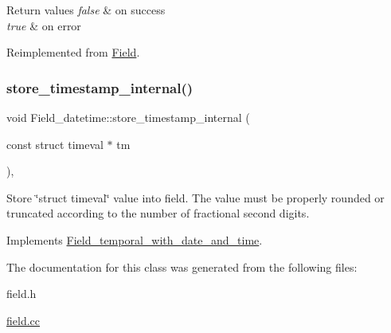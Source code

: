 \begin{DoxyRetVals}{Return values}
{\em false} & on success \\
\hline
{\em true} & on error \\
\hline
\end{DoxyRetVals}


Reimplemented from \mbox{\hyperlink{classField_a5c09752e8441d64ce2e4e611508bab7a}{Field}}.

\mbox{\label{classField__datetime_ae05689a45e7e14f5061f75202a6e9280}} 
\subsubsection{\texorpdfstring{store\+\_\+timestamp\+\_\+internal()}{store\_timestamp\_internal()}}
{\footnotesize\ttfamily void Field\+\_\+datetime\+::store\+\_\+timestamp\+\_\+internal (\begin{DoxyParamCaption}\item[{const struct timeval $\ast$}]{tm }\end{DoxyParamCaption})\hspace{0.3cm}{\ttfamily [protected]}, {\ttfamily [virtual]}}

Store \char`\"{}struct timeval\char`\"{} value into field. The value must be properly rounded or truncated according to the number of fractional second digits. 

Implements \mbox{\hyperlink{classField__temporal__with__date__and__time_a3cfd6dc59b102362d592341dbf40a19e}{Field\+\_\+temporal\+\_\+with\+\_\+date\+\_\+and\+\_\+time}}.



The documentation for this class was generated from the following files\+:\begin{DoxyCompactItemize}
\item 
field.\+h\item 
\mbox{\hyperlink{field_8cc}{field.\+cc}}\end{DoxyCompactItemize}
